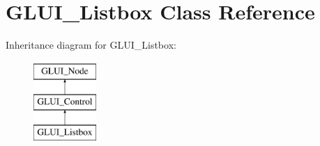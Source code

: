 \hypertarget{classGLUI__Listbox}{\section{G\-L\-U\-I\-\_\-\-Listbox Class Reference}
\label{classGLUI__Listbox}
}
Inheritance diagram for G\-L\-U\-I\-\_\-\-Listbox\-:\begin{figure}[H]
\begin{center}
\leavevmode
\includegraphics[height=3.000000cm]{classGLUI__Listbox}
\end{center}
\end{figure}
